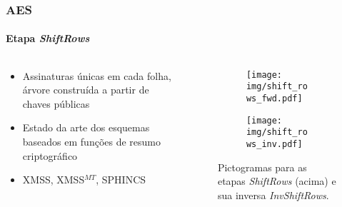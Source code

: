 \documentclass[12pt]{beamer}
\begin{document}
\begin{frame}
    \frametitle{AES}
    \framesubtitle{Etapa \emph{ShiftRows}}
    \begin{columns}[T]
        \begin{column}{.7\textwidth}
          \begin{itemize}
            \item Assinaturas únicas em cada folha, árvore construída a partir de chaves públicas
            \item Estado da arte dos esquemas baseados em funções de resumo criptográfico
            \item XMSS, XMSS$^{MT}$, SPHINCS
          \end{itemize}
        \end{column}
        \begin{column}{.25\textwidth}
            \begin{figure}
            \centering
            \begin{subfigure}[b]{0.7\textwidth}
               \texttt{[image: img/shift\_rows\_fwd.pdf]}
               \vspace{2mm}
            \end{subfigure}
            
            \begin{subfigure}[b]{0.7\textwidth}
               \texttt{[image: img/shift\_rows\_inv.pdf]}
            \end{subfigure}
                    \captionsetup{font=scriptsize}
        
            \caption*{Pictogramas para as etapas \emph{ShiftRows} (acima) e sua inversa \emph{InvShiftRows}.}
            \end{figure}
        \end{column}
    \end{columns}
\end{frame}
\end{document}
